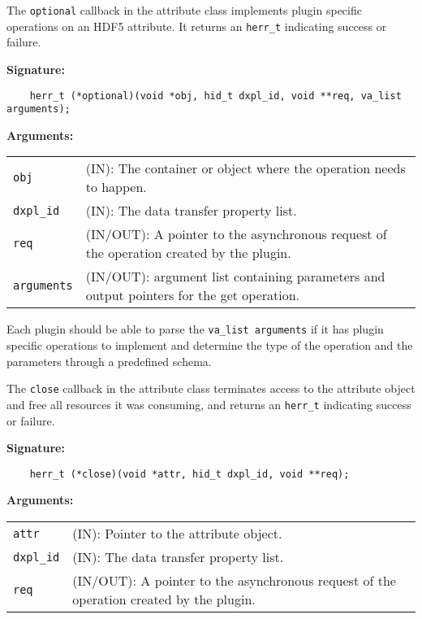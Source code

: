 The \texttt{optional} callback in the attribute class implements plugin specific operations on an HDF5 attribute. It returns an \texttt{herr\_t} indicating success or failure. \bigskip

\begin{mdframed}[style=bgbox]
\textbf{Signature:}
\begin{lstlisting}
    herr_t (*optional)(void *obj, hid_t dxpl_id, void **req, va_list arguments);
\end{lstlisting}

\textbf{Arguments:}\\
\begin{tabular}{l p{10cm}}
  \texttt{obj} & (IN): The container or object where the operation needs to happen.\\
  \texttt{dxpl\_id} & (IN): The data transfer property list.\\
  \texttt{req} & (IN/OUT): A pointer to the asynchronous request of the operation created by the plugin.\\
  \texttt{arguments} & (IN/OUT): argument list containing parameters and output pointers for the get operation. \\
\end{tabular}
\end{mdframed}

Each plugin should be able to parse the \texttt{va\_list arguments} if it has plugin specific operations to implement and determine the type of the operation and the parameters through a predefined schema. 

The \texttt{close} callback in the attribute class terminates
access to the attribute object and free all resources it was
consuming, and returns an \texttt{herr\_t} indicating success or failure.\bigskip

\begin{mdframed}[style=bgbox]
\textbf{Signature:}
\begin{lstlisting}
    herr_t (*close)(void *attr, hid_t dxpl_id, void **req);
\end{lstlisting}

\textbf{Arguments:}\\
\begin{tabular}{l p{10cm}}
  \texttt{attr} & (IN): Pointer to the attribute object.\\
  \texttt{dxpl\_id} & (IN): The data transfer property list.\\
  \texttt{req} & (IN/OUT): A pointer to the asynchronous request of the
  operation created by the plugin.\\
\end{tabular}
\end{mdframed}

